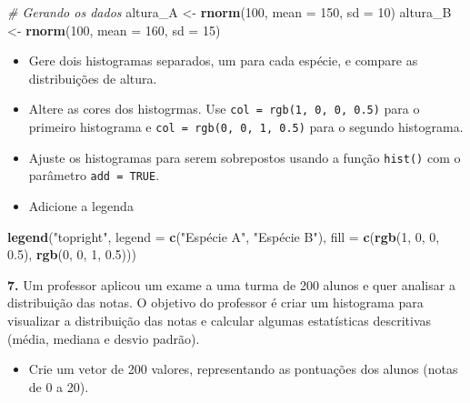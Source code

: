 \documentclass[
]{book}
\newenvironment{Shaded}{\begin{snugshade}}{\end{snugshade}}
\newcommand{\AttributeTok}[1]{\textcolor[rgb]{0.13,0.29,0.53}{#1}}
\newcommand{\CommentTok}[1]{\textcolor[rgb]{0.56,0.35,0.01}{\textit{#1}}}
\newcommand{\DecValTok}[1]{\textcolor[rgb]{0.00,0.00,0.81}{#1}}
\newcommand{\FloatTok}[1]{\textcolor[rgb]{0.00,0.00,0.81}{#1}}
\newcommand{\FunctionTok}[1]{\textcolor[rgb]{0.13,0.29,0.53}{\textbf{#1}}}
\newcommand{\NormalTok}[1]{#1}
\newcommand{\OtherTok}[1]{\textcolor[rgb]{0.56,0.35,0.01}{#1}}
\newcommand{\StringTok}[1]{\textcolor[rgb]{0.31,0.60,0.02}{#1}}
\providecommand{\tightlist}{%
  \setlength{\itemsep}{0pt}\setlength{\parskip}{0pt}}
\begin{document}
\begin{Shaded}
\begin{Highlighting}[]
\CommentTok{\# Gerando os dados}
\NormalTok{altura\_A }\OtherTok{\textless{}{-}} \FunctionTok{rnorm}\NormalTok{(}\DecValTok{100}\NormalTok{, }\AttributeTok{mean =} \DecValTok{150}\NormalTok{, }\AttributeTok{sd =} \DecValTok{10}\NormalTok{)}
\NormalTok{altura\_B }\OtherTok{\textless{}{-}} \FunctionTok{rnorm}\NormalTok{(}\DecValTok{100}\NormalTok{, }\AttributeTok{mean =} \DecValTok{160}\NormalTok{, }\AttributeTok{sd =} \DecValTok{15}\NormalTok{)}
\end{Highlighting}
\end{Shaded}

\begin{itemize}
\item
  Gere dois histogramas separados, um para cada espécie, e compare as distribuições de altura.
\item
  Altere as cores dos histogrmas. Use \texttt{col\ =\ rgb(1,\ 0,\ 0,\ 0.5)} para o primeiro histograma e \texttt{col\ =\ rgb(0,\ 0,\ 1,\ 0.5)} para o segundo histograma.
\item
  Ajuste os histogramas para serem sobrepostos usando a função \texttt{hist()} com o parâmetro \texttt{add\ =\ TRUE}.
\item
  Adicione a legenda
\end{itemize}

\begin{Shaded}
\begin{Highlighting}[]
\FunctionTok{legend}\NormalTok{(}\StringTok{"topright"}\NormalTok{, }\AttributeTok{legend =} \FunctionTok{c}\NormalTok{(}\StringTok{"Espécie A"}\NormalTok{, }\StringTok{"Espécie B"}\NormalTok{), }\AttributeTok{fill =} \FunctionTok{c}\NormalTok{(}\FunctionTok{rgb}\NormalTok{(}\DecValTok{1}\NormalTok{, }\DecValTok{0}\NormalTok{, }\DecValTok{0}\NormalTok{, }\FloatTok{0.5}\NormalTok{), }\FunctionTok{rgb}\NormalTok{(}\DecValTok{0}\NormalTok{, }\DecValTok{0}\NormalTok{, }\DecValTok{1}\NormalTok{, }\FloatTok{0.5}\NormalTok{)))}
\end{Highlighting}
\end{Shaded}

\textbf{7.} Um professor aplicou um exame a uma turma de 200 alunos e quer analisar a distribuição das notas. O objetivo do professor é criar um histograma para visualizar a distribuição das notas e calcular algumas estatísticas descritivas (média, mediana e desvio padrão).

\begin{itemize}
\tightlist
\item
  Crie um vetor de 200 valores, representando as pontuações dos alunos (notas de 0 a 20).
\end{itemize}
\end{document}
